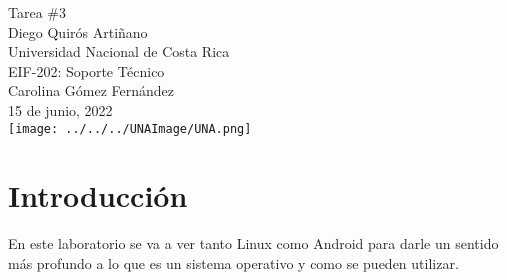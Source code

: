 \documentclass[stu, 12pt, letterpaper, donotrepeattitle, floatsintext, natbib, helv]{apa7}
\begin{document}
\begin{titlepage}
    \centering
    \vfill
    \LARGE Tarea \#3\\
    \vskip2cm
    \large Diego Quirós Artiñano \\
    Universidad Nacional de Costa Rica \\
    EIF-202: Soporte Técnico \\ 
    Carolina Gómez Fernández \\
    15 de junio, 2022 \\
    \vfill
    \texttt{[image: ../../../UNAImage/UNA.png]} \\
    \vfill
    \vfill
\end{titlepage}

\addto{}
\tableofcontents
\setcounter{tocdepth}{2}
\newpage


\section*{Introducción}
{}
En este laboratorio se va a ver tanto Linux como Android para darle un sentido más profundo a lo que es un sistema operativo y como se pueden utilizar.

\end{document}
